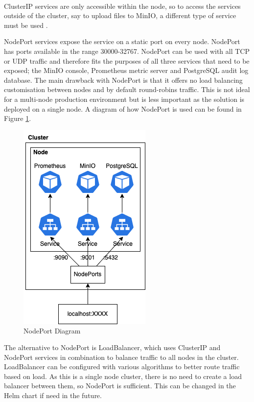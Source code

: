 \documentclass[12pt, conference, final, a4paper, onecolumn, compsoc]{IEEEtran}
\begin{document}
\paragraph{}

ClusterIP services are only accessible within the node, so to access the
services outside of the cluster, say to upload files to MinIO, a different type
of service must be used \citep{kube-svc}.

NodePort services expose the service on a static port on every node. NodePort
has ports available in the range 30000-32767. NodePort can be used with all TCP
or UDP traffic and therefore fits the purposes of all three services that need
to be exposed; the MinIO console, Prometheus metric server and PostgreSQL audit
log database. The main drawback with NodePort is that it offers no load
balancing customisation between nodes and by default round-robins traffic. This
is not ideal for a multi-node production environment but is less important as
the solution is deployed on a single node. A diagram of how NodePort
is used can be found in Figure \ref{fig:nodeport}.

\begin{figure}[H]
  \centering \includegraphics[scale=0.5]{diagrams/nodeport.png}
  \caption{NodePort Diagram}
  \label{fig:nodeport}
\end{figure}

The alternative to NodePort is LoadBalancer, which uses ClusterIP and NodePort
services in combination to balance traffic to all nodes in the cluster.
LoadBalancer can be configured with various algorithms to better route traffic
based on load. As this is a single node cluster, there is no need to create a
load balancer between them, so NodePort is sufficient. This can be changed in
the Helm chart if need in the future.
\end{document}
